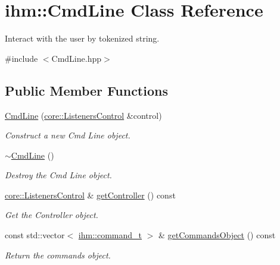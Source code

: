 \hypertarget{classihm_1_1CmdLine}{}\section{ihm\+:\+:Cmd\+Line Class Reference}
\label{classihm_1_1CmdLine}


Interact with the user by tokenized string.  




{\ttfamily \#include $<$Cmd\+Line.\+hpp$>$}

\subsection*{Public Member Functions}
\begin{DoxyCompactItemize}
\item 
\mbox{\label{classihm_1_1CmdLine_ad3bb0bb95b1e283b1fcd3e064f2ff393}} 
\hyperlink{classihm_1_1CmdLine_ad3bb0bb95b1e283b1fcd3e064f2ff393}{Cmd\+Line} (\hyperlink{classcore_1_1ListenersControl}{core\+::\+Listeners\+Control} \&control)
\begin{DoxyCompactList}\small\item\em Construct a new Cmd Line object. \end{DoxyCompactList}\item 
\mbox{\label{classihm_1_1CmdLine_a1fe3dd7c91f9662c9c84e8d8ebaf8423}} 
\hyperlink{classihm_1_1CmdLine_a1fe3dd7c91f9662c9c84e8d8ebaf8423}{$\sim$\+Cmd\+Line} ()
\begin{DoxyCompactList}\small\item\em Destroy the Cmd Line object. \end{DoxyCompactList}\item 
\mbox{\label{classihm_1_1CmdLine_a35dec9782c4ff1e0bc5863dd919e1a10}} 
\hyperlink{classcore_1_1ListenersControl}{core\+::\+Listeners\+Control} \& \hyperlink{classihm_1_1CmdLine_a35dec9782c4ff1e0bc5863dd919e1a10}{get\+Controller} () const
\begin{DoxyCompactList}\small\item\em Get the Controller object. \end{DoxyCompactList}\item 
\mbox{\label{classihm_1_1CmdLine_abc24ef8ae2fcda3500f4d414051719a9}} 
const std\+::vector$<$ \hyperlink{structihm_1_1command__t}{ihm\+::command\+\_\+t} $>$ \& \hyperlink{classihm_1_1CmdLine_abc24ef8ae2fcda3500f4d414051719a9}{get\+Commands\+Object} () const
\begin{DoxyCompactList}\small\item\em Return the commands object. \end{DoxyCompactList}\end{DoxyCompactItemize}


